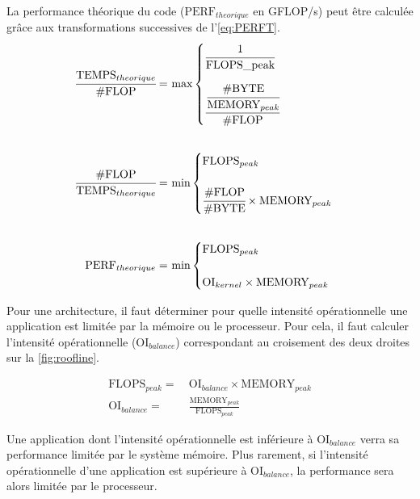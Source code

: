 La performance théorique du code ($\text{PERF}_{theorique}$ en GFLOP/s) peut être calculée grâce aux transformations successives de l'\autoref{eq:PERFT}.
\begin{equation}
\begin{aligned}
\label{eq:PERFT}
\cfrac{\text{TEMPS}_{theorique}}{\text{\#FLOP}}  =\ &\text{max}
\begin{cases} 
    \cfrac {1}{\text{FLOPS\_{peak}}}    \\[15pt]  
    \cfrac {\cfrac{\text{\#BYTE}}{\text{MEMORY}_{peak}}}{\text{\#FLOP}} 
\end{cases}\\[20pt]
\cfrac{\text{\#FLOP}}{\text{TEMPS}_{theorique}}  =\ &\text{min}
\begin{cases} 
    \text{FLOPS}_{peak}    \\[15pt]  
    \cfrac{\text{\#FLOP}}{\text{\#BYTE}} \times \text{MEMORY}_{peak}
\end{cases}\\[20pt]
\text{PERF}_{theorique}  =\ &\text{min}
\begin{cases} 
    \text{FLOPS}_{peak}    \\[15pt]  
    \text{OI}_{kernel} \times \text{MEMORY}_{peak} 
\end{cases}
\end{aligned}
\end{equation}



Pour une architecture, il faut déterminer pour quelle intensité opérationnelle une application est limitée par la mémoire ou le processeur. Pour cela, il faut calculer l’intensité opérationnelle ($\text{OI}_{balance}$) correspondant au croisement des deux droites sur la \autoref{fig:roofline}. 

\begin{equation}
\begin{aligned}
 \text{FLOPS}_{peak} =\ &\text{OI}_{balance} \times \text{MEMORY}_{peak} \\[20pt]
 \text{OI}_{balance} =\ &\frac{\text{MEMORY}_{peak}} {\text{FLOPS}_{peak}} 
\end{aligned}
\end{equation}

Une application dont l’intensité opérationnelle est inférieure à $\text{OI}_{balance}$ verra sa performance limitée par le système mémoire. Plus rarement, si l’intensité opérationnelle d’une application est supérieure à $\text{OI}_{balance}$, la performance sera alors limitée par le processeur.

